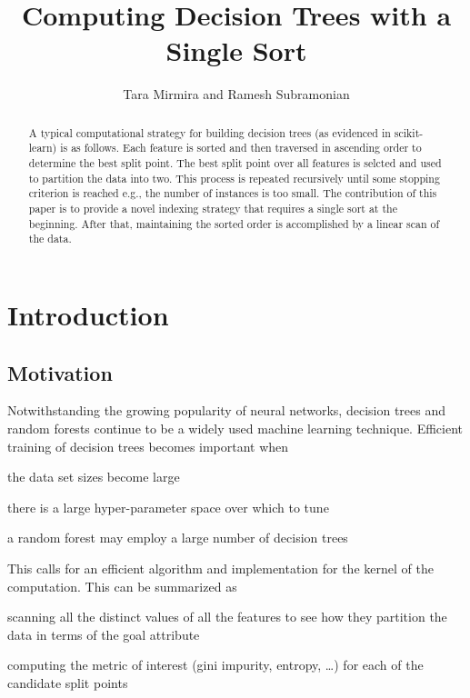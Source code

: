 \documentclass[12pt,letterpaper]{article}
\begin{document}
\title{Computing Decision Trees with a Single Sort}
\author{Tara Mirmira and Ramesh Subramonian}
\maketitle
\thispagestyle{fancy}
\lhead{}
\chead{}
\rhead{}
\lfoot{}
\rfoot{{\small \thepage}}

\begin{abstract}
A typical computational strategy for building decision trees (as evidenced in
  scikit-learn) is as follows. Each feature is sorted and then traversed in
  ascending order to determine the best split point. The best split point over
  all features is selcted and used to partition the data into two. This
  process is repeated recursively until some stopping criterion is reached e.g.,
  the number of instances is
  too small. The contribution of this paper is to provide a novel indexing
  strategy that requires a single sort at the beginning. After that, maintaining
  the sorted order is accomplished by a linear scan of the data.
\end{abstract}

\section{Introduction}

\TBC

\subsection{Motivation}
Notwithstanding the growing popularity of neural networks, decision trees and
random forests continue to be a widely used machine learning technique.
Efficient training of decision trees becomes important when 
\be
\item the data set sizes become large
\item there is a large hyper-parameter space over which to tune
\item a random forest may employ a large number of decision  trees
\ee

This calls for an efficient algorithm and implementation for the kernel of the
computation. This can be summarized as 
\be
\item scanning all the distinct values of all the features to see how they
  partition the data in terms of the goal attribute
\item computing the metric of interest (gini impurity, entropy, \ldots) for 
 each of the
  candidate split points
  \ee
\end{document}
